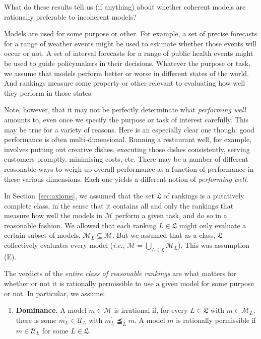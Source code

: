 \documentclass[11pt]{article}
\theoremstyle{definition}
\theoremstyle{remark}
\newcommand{\M}{\mathcal M}
\newcommand{\U}{\mathcal U}
\begin{document}
What do these results tell us (if anything) about whether coherent models are rationally preferable to incoherent models?

Models are used for some purpose or other. For example, a set of precise forecasts for a range of weather events might be used to estimate whether those events will occur or not. A set of interval forecasts for a range of public health events might be used to guide policymakers in their decisions. Whatever the purpose or task, we assume that models perform better or worse in different states of the world. And rankings measure some property or other relevant to evaluating how well they perform in those states.

Note, however, that it may not be perfectly determinate what \textit{performing well} amounts to, even once we specify the purpose or task of interest carefully. This may be true for a variety of reasons. Here is an especially clear one though: good performance is often multi-dimensional. Running a restaurant well, for example, involves putting out creative dishes, executing those dishes consistently, serving customers promptly, minimising costs, etc. There may be a number of different reasonable ways to weigh up overall performance as a function of performance in these various dimensions. Each one yields a different notion of \textit{performing well}.

In Section~\ref{sec:axioms}, we assumed that the set $\mathfrak L$ of rankings is a putatively complete class, in the sense that it contains all and only the rankings that measure how well the models in $\M$ perform a given task, and do so in a reasonable fashion. We allowed that each ranking $L\in\mathfrak L$ might only evaluate a certain subset of models, $\M_L\subseteq\M$. But we assumed that as a class, $\mathfrak L$ collectively evaluates every model (\textit{i.e.}, $\M=\bigcup_{L\in\mathfrak L}\M_L$). This was assumption (E).

The verdicts of the \textit{entire class of reasonable rankings} are what matters for whether or not it is rationally permissible to use a given model for some purpose or not. In particular, we assume:
\begin{enumerate}[label=\textbf{(D)},leftmargin=*]
\item \textbf{Dominance.} A model $m\in\M$ is irrational if, for every $L\in\mathfrak L$ with $m\in\M_L$, there is some $m_L^\prime\in\U_L$ with $m_L^\prime\precneqq_L m$. A model $m$ is rationally permissible if $m\in\U_L$ for some $L\in\mathfrak L$.
\end{enumerate}
\end{document}
